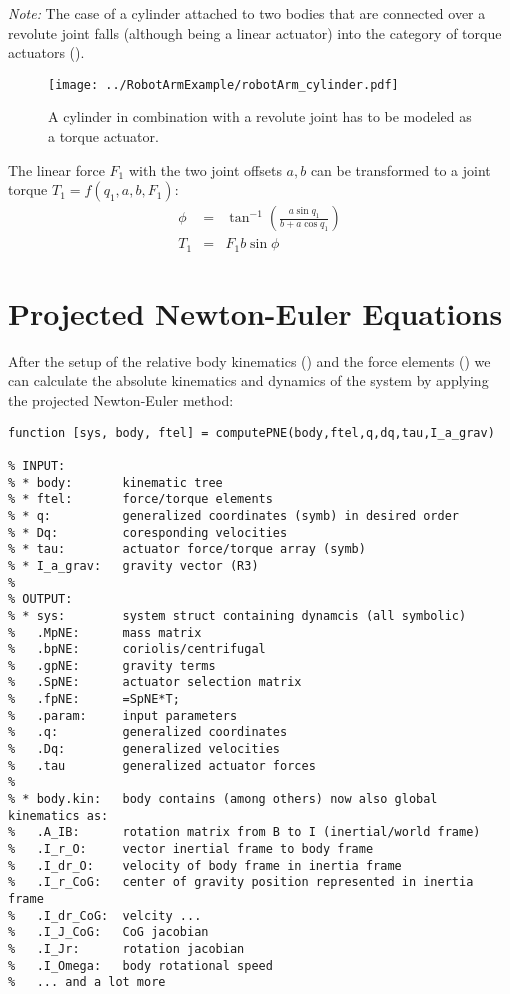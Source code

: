 \textit{Note:} The case of a cylinder attached to two bodies that are connected over a revolute joint falls (although being a linear actuator) into the category of torque actuators ().  

\begin{figure}[H]
	\centering
		\texttt{[image: ../RobotArmExample/robotArm\_cylinder.pdf]}
	\caption{A cylinder in combination with a revolute joint has to be modeled as a torque actuator.}
	\label{fig:robotArmcylinder}
\end{figure}

The linear force $F_1$ with the two joint offsets $a,b$ can be transformed to a joint torque $T_1=f\left(q_1,a,b,F_1\right)$:
\begin{eqnarray}
\phi &=& \tan^{-1}\left(\frac{a\sin{q_1}}{b+a\cos{q_1}}\right) \\
T_1 &=& F_1 b\sin{\phi}
\end{eqnarray}


\section{Projected Newton-Euler Equations}
After the setup of the relative body kinematics () and the force elements () we can calculate the absolute kinematics and dynamics of the system by applying the projected Newton-Euler method:

\begin{lstlisting}
function [sys, body, ftel] = computePNE(body,ftel,q,dq,tau,I_a_grav)
 
% INPUT:
% * body:       kinematic tree
% * ftel:       force/torque elements
% * q:          generalized coordinates (symb) in desired order
% * Dq:         coresponding velocities
% * tau:        actuator force/torque array (symb)
% * I_a_grav:   gravity vector (R3)
%
% OUTPUT:
% * sys:        system struct containing dynamcis (all symbolic)
%   .MpNE:      mass matrix
%   .bpNE:      coriolis/centrifugal
%   .gpNE:      gravity terms
%   .SpNE:      actuator selection matrix
%   .fpNE:      =SpNE*T;
%   .param:     input parameters
%   .q:         generalized coordinates
%   .Dq:        generalized velocities
%   .tau        generalized actuator forces
%
% * body.kin:   body contains (among others) now also global kinematics as:
%   .A_IB:      rotation matrix from B to I (inertial/world frame)
%   .I_r_O:     vector inertial frame to body frame
%   .I_dr_O:    velocity of body frame in inertia frame
%   .I_r_CoG:   center of gravity position represented in inertia frame
%   .I_dr_CoG:  velcity ...
%   .I_J_CoG:   CoG jacobian
%   .I_Jr:      rotation jacobian
%   .I_Omega:   body rotational speed
%   ... and a lot more  

\end{lstlisting}


